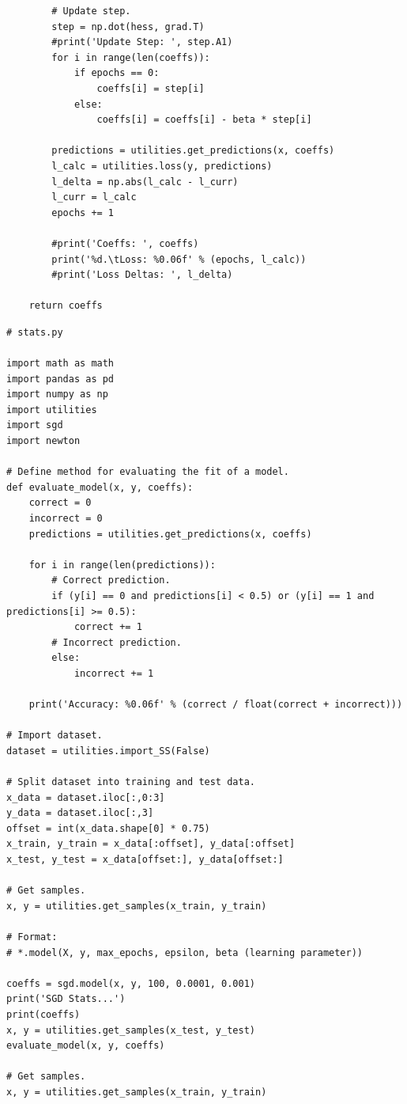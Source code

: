 \documentclass[letterpaper]{article} %
\begin{document}
{\begin{verbatim}
        # Update step.
        step = np.dot(hess, grad.T)
        #print('Update Step: ', step.A1)
        for i in range(len(coeffs)):
            if epochs == 0:
                coeffs[i] = step[i]
            else:
                coeffs[i] = coeffs[i] - beta * step[i]

        predictions = utilities.get_predictions(x, coeffs)
        l_calc = utilities.loss(y, predictions)
        l_delta = np.abs(l_calc - l_curr)
        l_curr = l_calc
        epochs += 1

        #print('Coeffs: ', coeffs)
        print('%d.\tLoss: %0.06f' % (epochs, l_calc))
        #print('Loss Deltas: ', l_delta)

    return coeffs

\end{verbatim}

\bigskip

\begin{verbatim}
# stats.py

import math as math
import pandas as pd
import numpy as np
import utilities
import sgd
import newton

# Define method for evaluating the fit of a model.
def evaluate_model(x, y, coeffs):
    correct = 0
    incorrect = 0
    predictions = utilities.get_predictions(x, coeffs)

    for i in range(len(predictions)):
        # Correct prediction.
        if (y[i] == 0 and predictions[i] < 0.5) or (y[i] == 1 and predictions[i] >= 0.5):
            correct += 1
        # Incorrect prediction.
        else:
            incorrect += 1

    print('Accuracy: %0.06f' % (correct / float(correct + incorrect)))

# Import dataset.
dataset = utilities.import_SS(False)

# Split dataset into training and test data.
x_data = dataset.iloc[:,0:3]
y_data = dataset.iloc[:,3]
offset = int(x_data.shape[0] * 0.75)
x_train, y_train = x_data[:offset], y_data[:offset]
x_test, y_test = x_data[offset:], y_data[offset:]

# Get samples.
x, y = utilities.get_samples(x_train, y_train)

# Format:
# *.model(X, y, max_epochs, epsilon, beta (learning parameter))

coeffs = sgd.model(x, y, 100, 0.0001, 0.001)
print('SGD Stats...')
print(coeffs)
x, y = utilities.get_samples(x_test, y_test)
evaluate_model(x, y, coeffs)

# Get samples.
x, y = utilities.get_samples(x_train, y_train)


\end{verbatim}}
\end{document}
